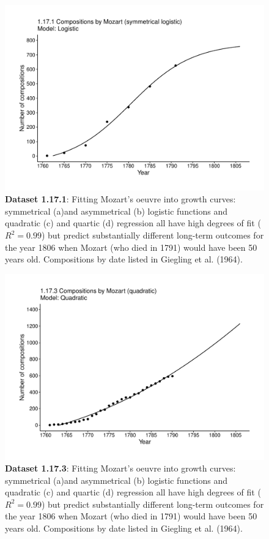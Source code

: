 \documentclass[aps,rmp,preprint,superscriptaddress,10pt,onecolumn]{article}
\begin{document}
\clearpage
\begin{figure}[h]
\includegraphics[width=\textwidth]{output/figs-ggplot/1.17.1.pdf}
\caption{\textbf{Dataset 1.17.1}: Fitting Mozart's oeuvre into growth curves: symmetrical (a)and asymmetrical (b) logistic functions and quadratic (c) and quartic (d) regression all have high degrees of fit ($R^2=0.99$) but predict substantially different long-term outcomes for the year 1806 when Mozart (who died in 1791) would have been 50 years old. Compositions by date listed in Giegling et al. (1964).}
\end{figure}
	
\clearpage
\begin{figure}[h]
\includegraphics[width=\textwidth]{output/figs-ggplot/1.17.3.pdf}
\caption{\textbf{Dataset 1.17.3}: Fitting Mozart's oeuvre into growth curves: symmetrical (a)and asymmetrical (b) logistic functions and quadratic (c) and quartic (d) regression all have high degrees of fit ($R^2=0.99$) but predict substantially different long-term outcomes for the year 1806 when Mozart (who died in 1791) would have been 50 years old. Compositions by date listed in Giegling et al. (1964).}
\end{figure}
	
\end{document}
